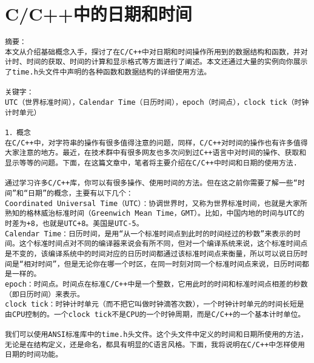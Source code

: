 \section{C/C++中的日期和时间}
\begin{verbatim}
摘要： 
本文从介绍基础概念入手，探讨了在C/C++中对日期和时间操作所用到的数据结构和函数，并对计时、时间的获取、时间的计算和显示格式等方面进行了阐述。本文还通过大量的实例向你展示了time.h头文件中声明的各种函数和数据结构的详细使用方法。 

关键字： 
UTC（世界标准时间），Calendar Time（日历时间），epoch（时间点），clock tick（时钟计时单元） 

1．概念 
在C/C++中，对字符串的操作有很多值得注意的问题，同样，C/C++对时间的操作也有许多值得大家注意的地方。最近，在技术群中有很多网友也多次问到过C++语言中对时间的操作、获取和显示等等的问题。下面，在这篇文章中，笔者将主要介绍在C/C++中时间和日期的使用方法.

通过学习许多C/C++库，你可以有很多操作、使用时间的方法。但在这之前你需要了解一些“时间”和“日期”的概念，主要有以下几个： 
Coordinated Universal Time（UTC）：协调世界时，又称为世界标准时间，也就是大家所熟知的格林威治标准时间（Greenwich Mean Time，GMT）。比如，中国内地的时间与UTC的时差为+8，也就是UTC+8。美国是UTC-5。 
Calendar Time：日历时间，是用“从一个标准时间点到此时的时间经过的秒数”来表示的时间。这个标准时间点对不同的编译器来说会有所不同，但对一个编译系统来说，这个标准时间点是不变的，该编译系统中的时间对应的日历时间都通过该标准时间点来衡量，所以可以说日历时间是“相对时间”，但是无论你在哪一个时区，在同一时刻对同一个标准时间点来说，日历时间都是一样的。 
epoch：时间点。时间点在标准C/C++中是一个整数，它用此时的时间和标准时间点相差的秒数（即日历时间）来表示。 
clock tick：时钟计时单元（而不把它叫做时钟滴答次数），一个时钟计时单元的时间长短是由CPU控制的。一个clock tick不是CPU的一个时钟周期，而是C/C++的一个基本计时单位。 

我们可以使用ANSI标准库中的time.h头文件。这个头文件中定义的时间和日期所使用的方法，无论是在结构定义，还是命名，都具有明显的C语言风格。下面，我将说明在C/C++中怎样使用日期的时间功能。 


\end{verbatim}
